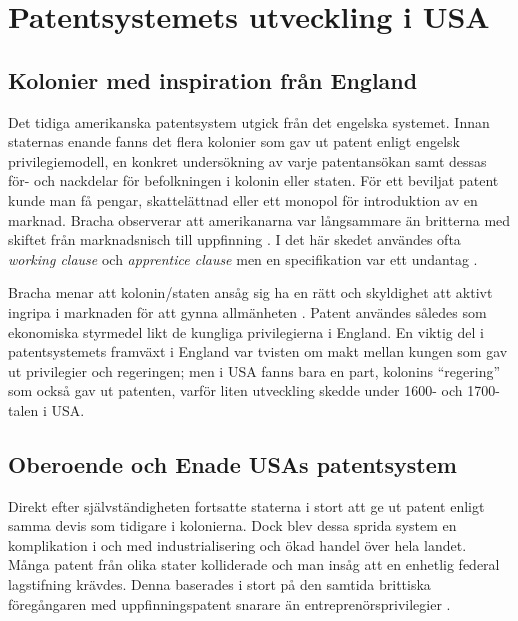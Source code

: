 \section{Patentsystemets utveckling i USA} 
\label{sec:usa}

\subsection{Kolonier med inspiration från England}

Det tidiga amerikanska patentsystem utgick från det engelska systemet. Innan staternas enande fanns det
flera kolonier som gav ut patent enligt engelsk privilegiemodell, en konkret undersökning av varje
patentansökan samt dessas för- och nackdelar för befolkningen i kolonin eller staten. För ett beviljat
patent kunde man få pengar, skattelättnad eller ett monopol för introduktion av en marknad. Bracha
observerar att amerikanarna var långsammare än britterna med skiftet från marknadsnisch till
uppfinning \cite{bracha}. I det här skedet användes ofta \emph{working clause} och \emph{apprentice
clause} men en specifikation var ett undantag \cite{bracha}.

Bracha menar att kolonin/staten ansåg sig ha en rätt och skyldighet att aktivt ingripa i marknaden
för att gynna allmänheten \cite{bracha}. Patent användes således som ekonomiska styrmedel likt de
kungliga privilegierna i England. En viktig del i patentsystemets framväxt i England var tvisten om makt
mellan kungen som gav ut privilegier och regeringen; men i USA fanns bara en part, kolonins ``regering''
som också gav ut patenten, varför liten utveckling skedde under 1600- och 1700-talen i USA.



\subsection{Oberoende och Enade USAs patentsystem}

Direkt efter självständigheten fortsatte staterna i stort att ge ut patent enligt samma devis som tidigare i
kolonierna. Dock blev dessa sprida system en komplikation i och med industrialisering och ökad handel över
hela landet. Många patent från olika stater kolliderade och man insåg att en enhetlig federal
lagstifning krävdes. Denna baserades i stort på den samtida brittiska föregångaren med uppfinningspatent
snarare än entreprenörsprivilegier \cite{nard}.

